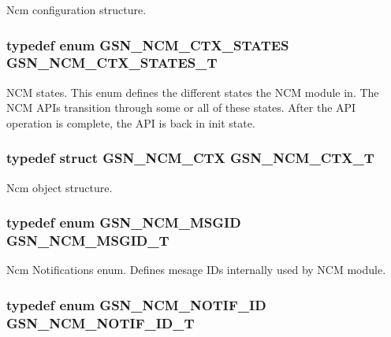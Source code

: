 Ncm configuration structure. 

\hypertarget{a00688_gaf5a85b17466f3a523dbf5643e72f628d}{
\subsubsection[{GSN\_\-NCM\_\-CTX\_\-STATES\_\-T}]{\setlength{\rightskip}{0pt plus 5cm}typedef enum {\bf GSN\_\-NCM\_\-CTX\_\-STATES}  {\bf GSN\_\-NCM\_\-CTX\_\-STATES\_\-T}}}
\label{a00688_gaf5a85b17466f3a523dbf5643e72f628d}


NCM states. This enum defines the different states the NCM module in. The NCM APIs transition through some or all of these states. After the API operation is complete, the API is back in init state. 

\hypertarget{a00688_ga102caaf372e99d011f89da1602cdc514}{
\subsubsection[{GSN\_\-NCM\_\-CTX\_\-T}]{\setlength{\rightskip}{0pt plus 5cm}typedef struct {\bf GSN\_\-NCM\_\-CTX} {\bf GSN\_\-NCM\_\-CTX\_\-T}}}
\label{a00688_ga102caaf372e99d011f89da1602cdc514}


Ncm object structure. 

\hypertarget{a00688_ga1df95350543744eb99d0ce7433e6db16}{
\subsubsection[{GSN\_\-NCM\_\-MSGID\_\-T}]{\setlength{\rightskip}{0pt plus 5cm}typedef enum {\bf GSN\_\-NCM\_\-MSGID}  {\bf GSN\_\-NCM\_\-MSGID\_\-T}}}
\label{a00688_ga1df95350543744eb99d0ce7433e6db16}


Ncm Notifications enum. Defines mesage IDs internally used by NCM module. 

\hypertarget{a00688_ga0be96257e7b0db4dd67006357eb5cec6}{
\subsubsection[{GSN\_\-NCM\_\-NOTIF\_\-ID\_\-T}]{\setlength{\rightskip}{0pt plus 5cm}typedef enum {\bf GSN\_\-NCM\_\-NOTIF\_\-ID}  {\bf GSN\_\-NCM\_\-NOTIF\_\-ID\_\-T}}}
\label{a00688_ga0be96257e7b0db4dd67006357eb5cec6}


